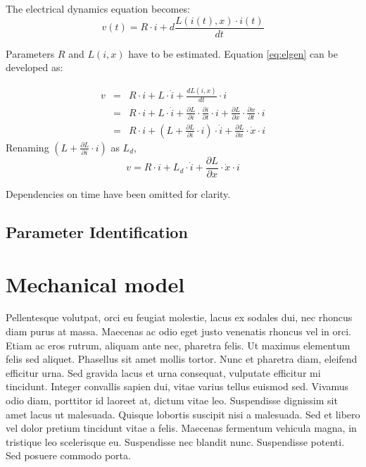 \documentclass[a4paper, 11pt] {article}
\begin{document}
The electrical dynamics equation becomes:
\begin{equation}
\label{eq:elgen}
v(t) = R \cdot i + d \frac{L(i(t),x) \cdot i(t)}{dt}
\end{equation}

Parameters $R$ and $L(i,x)$ have to be estimated. Equation \ref{eq:elgen} can be developed as:

\begin{eqnarray*}
v &=& R \cdot i + L \cdot  \dot{i} + \frac{d L(i,x)}{dt} \cdot  i \\
&=& R \cdot i + L \cdot \dot{i} + \frac{\partial L}{\partial i} \cdot \frac{\partial i}{\partial t} \cdot i + \frac{\partial L}{\partial x} \cdot \frac{\partial x}{\partial t} \cdot  i \\
&=& R \cdot  i + ( L + \frac{\partial L}{\partial i} \cdot i ) \cdot \dot{i} + \frac{\partial L}{\partial x} \cdot  \dot{x} \cdot  i 
\end{eqnarray*}
Renaming $( L + \frac{\partial L}{\partial i} \cdot i )$ as $L_{d}$,
\begin{equation}
v = R \cdot i + L_{d} \cdot \dot{i} + \frac{\partial L}{\partial x} \cdot  \dot{x} \cdot i
\end{equation}

Dependencies on time have been omitted for clarity.

\subsection{Parameter Identification}
























\section{Mechanical model}

Pellentesque volutpat, orci eu feugiat molestie, lacus ex sodales dui, nec rhoncus diam purus at massa. Maecenas ac odio eget justo venenatis rhoncus vel in orci. Etiam ac eros rutrum, aliquam ante nec, pharetra felis. Ut maximus elementum felis sed aliquet. Phasellus sit amet mollis tortor. Nunc et pharetra diam, eleifend efficitur urna. Sed gravida lacus et urna consequat, vulputate efficitur mi tincidunt. Integer convallis sapien dui, vitae varius tellus euismod sed. Vivamus odio diam, porttitor id laoreet at, dictum vitae leo. Suspendisse dignissim sit amet lacus ut malesuada. Quisque lobortis suscipit nisi a malesuada. Sed et libero vel dolor pretium tincidunt vitae a felis. Maecenas fermentum vehicula magna, in tristique leo scelerisque eu. Suspendisse nec blandit nunc. Suspendisse potenti. Sed posuere commodo porta. 
\end{document}
